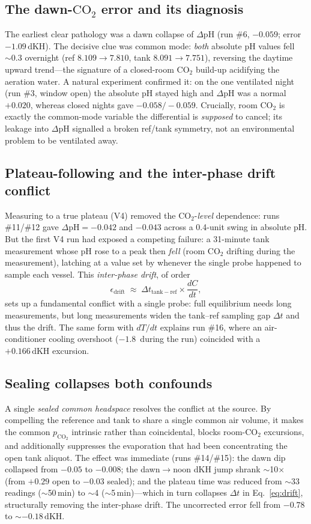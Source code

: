 \documentclass[11pt]{article}
\newcommand{\dpH}{\ensuremath{\Delta\mathrm{pH}}}
\newcommand{\dkh}{\ensuremath{\,\mathrm{dKH}}}
\newcommand{\co}{\ensuremath{\mathrm{CO_2}}}
\newcommand{\pco}{\ensuremath{p_{\mathrm{CO_2}}}}
\begin{document}
\subsection{The dawn-\co{} error and its diagnosis}
The earliest clear pathology was a dawn collapse of \dpH{} (run \#6,
$-0.059$; error $-1.09\dkh$). The decisive clue was common mode: \emph{both}
absolute pH values fell $\sim0.3$ overnight (ref $8.109\!\to\!7.810$, tank
$8.091\!\to\!7.751$), reversing the daytime upward trend---the signature of a
closed-room \co{} build-up acidifying the aeration water. A natural experiment
confirmed it: on the one ventilated night (run \#3, window open) the absolute
pH stayed high and \dpH{} was a normal $+0.020$, whereas closed nights gave
$-0.058/-0.059$. Crucially, room \co{} is exactly the common-mode variable the
differential is \emph{supposed} to cancel; its leakage into \dpH{} signalled a
broken ref/tank symmetry, not an environmental problem to be ventilated away.

\subsection{Plateau-following and the inter-phase drift conflict}
Measuring to a true plateau (V4) removed the \co{}-\emph{level} dependence: runs
\#11/\#12 gave $\dpH=-0.042$ and $-0.043$ across a 0.4-unit swing in absolute
pH. But the first V4 run had exposed a competing failure: a 31-minute tank
measurement whose pH rose to a peak then \emph{fell} (room \co{} drifting during
the measurement), latching at a value set by whenever the single probe happened
to sample each vessel. This \emph{inter-phase drift}, of order
\begin{equation}
\epsilon_\mathrm{drift} \;\approx\; \Delta t_{\mathrm{tank{-}ref}}\times \frac{dC}{dt},
\label{eq:drift}
\end{equation}
sets up a fundamental conflict with a single probe: full equilibrium needs long
measurements, but long measurements widen the tank--ref sampling gap
$\Delta t$ and thus the drift. The same form with $dT/dt$ explains run \#16,
where an air-conditioner cooling overshoot ($-1.8$\,\textcelsius{} during the
run) coincided with a $+0.166\dkh$ excursion.

\subsection{Sealing collapses both confounds}
A single \emph{sealed common headspace} resolves the conflict at the source. By
compelling the reference and tank to share a single common air volume, it makes
the common \pco{} intrinsic rather than coincidental, blocks room-\co{}
excursions, and additionally suppresses the evaporation that had been
concentrating the open tank aliquot.
The effect was immediate (runs \#14/\#15): the dawn dip collapsed from
$-0.05$ to $-0.008$; the dawn$\to$noon dKH jump shrank $\sim$10$\times$
(from $+0.29$ open to $-0.03$ sealed); and the plateau time was reduced from
$\sim$33 readings ($\sim$50\,min) to $\sim$4 ($\sim$5\,min)---which in turn
collapses $\Delta t$ in Eq.~\eqref{eq:drift}, structurally removing the
inter-phase drift. The uncorrected error fell from $-0.78$ to $\sim-0.18\dkh$.
\end{document}
